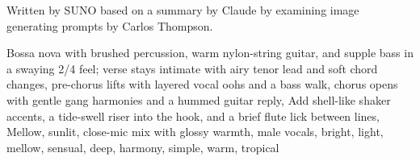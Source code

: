 
\begin{notes}
Written by SUNO based on a summary by Claude by examining image generating prompts by Carlos Thompson.
\end{notes}
\begin{style}
Bossa nova with brushed percussion, warm nylon-string guitar, and supple bass in a swaying 2/4 feel; verse stays intimate with airy tenor lead and soft chord changes, pre-chorus lifts with layered vocal oohs and a bass walk, chorus opens with gentle gang harmonies and a hummed guitar reply, Add shell-like shaker accents, a tide-swell riser into the hook, and a brief flute lick between lines, Mellow, sunlit, close-mic mix with glossy warmth, male vocals, bright, light, mellow, sensual, deep, harmony, simple, warm, tropical
\end{style}
